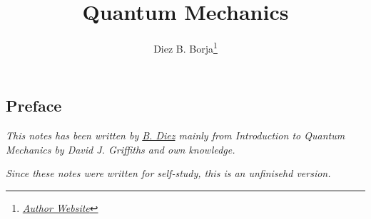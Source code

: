 \documentclass[10pt]{report}
\title{{\Huge Quantum Mechanics}}
\author{Diez B. Borja\footnote{\href{https://github.com/10blackhole}{\textit{Author Website}}}}
\begin{document}
  \maketitle
  \flushbottom
  \newpage
  \pagestyle{fancynotes}

\begin{center}
\pagestyle{plain}
\chapter*{Preface}
\bigskip
\bigskip
\bigskip
\bigskip
\bigskip
\bigskip


\emph{This notes has been written by \href{https://github.com/10BlackHole}{B. Diez} mainly from Introduction to Quantum Mechanics by David J. Griffiths and own knowledge.}

\emph{Since these notes were written for self-study, this is an unfinisehd version.}
\bigskip


\bigskip

\newpage
\end{center}







\end{document}

